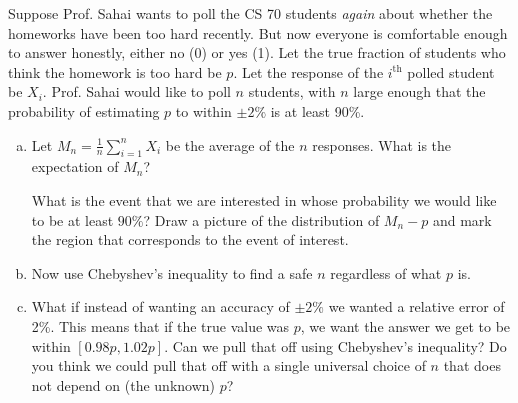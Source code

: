 \documentclass[11pt]{article}
\newif\ifsolutions
\begin{document}
\begin{enumerate}
Suppose Prof. Sahai wants to poll the CS 70 students {\em again} about
whether the homeworks have been too hard recently.  But now everyone
is comfortable enough to answer honestly, either no (0) or yes
(1). Let the true fraction of students who think the homework is too
hard be $p$. Let the response of the $i^{\text{th}}$ polled student be
$X_i$.  Prof. Sahai would like to poll $n$ students, with $n$ large
enough that the probability of estimating $p$ to within $\pm 2\% $ is at least 90\%.

\begin{enumerate}[a)]

\item Let $M_n = \frac{1}{n}\sum_{i=1}^n X_i$ be the average of the
  $n$ responses. What is the expectation of $M_n$?  

  What is the event that we are interested in whose probability we
  would like to be at least $90\%$? Draw a picture of the distribution
  of $M_n - p$ and mark the region that corresponds to the event of
  interest. 

\ifsolutions{\color{blue}{
\begin{equation*}
X_i = \begin{cases}
      1 &\mbox{hw is too hard} \\
      0 &\mbox{hw is not too hard}
      \end{cases}
\end{equation*}
$X_i$ is i.i.d Bernoulli r.v. with $\Pr[X_i=1] = p$. So, $M_n \sim \frac{1}{n}Binom(n,p)$:
\[ E[M_n] = \frac{1}{n}\sum_{i=1}^n E[X_i] = \frac{1}{n}\cdot(np) = p\]
We want 
\[ \Pr[|M_n - p| < 0.02] > 0.9 \]
Or equivalently,
\[ \Pr[|M_n - p| \geq 0.02] \leq 0.1 \]
}}\fi


\item Now use Chebyshev's inequality to find a safe $n$ regardless of
  what $p$ is. 
\ifsolutions{\color{blue}{
\[ Var[M_n] = \frac{1}{n^2} \sum_{i=1}^n Var[X_i] = \frac{p(1-p)}{n} \]
\[ \Pr[|M_n - p|] \geq 0.02] \leq \frac{Var[M_n]}{0.02^2} = \frac{p(1-p)}{(0.02)^2n} \leq 0.1 \]
\[ n \geq 25000p(1-p) \leq 6250 \]
Here, $p(1-p) \leq 1/4$ when equality holds of $p=1/2$.
}}\fi

\item What if instead of wanting an accuracy of $\pm 2\%$ we wanted a
  relative error of 2\%. This means that if the true value was $p$, we
  want the answer we get to be within $[0.98 p, 1.02p]$. Can we pull
  that off using Chebyshev's inequality? Do you think we could pull
  that off with a single universal choice of $n$ that does not depend
  on (the unknown) $p$?


\end{enumerate}
\end{enumerate}
\end{document}
